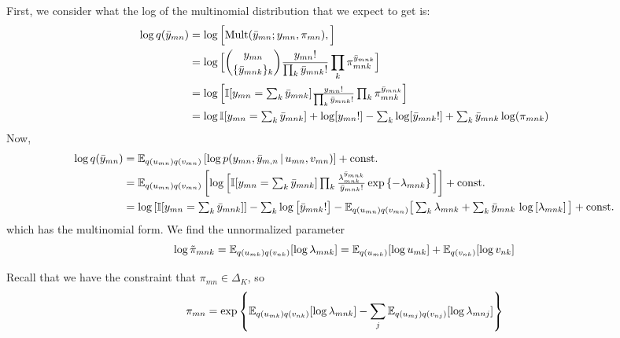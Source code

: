\begin{enumerate}[label=(\alph*)]
\begin{solution}
First, we consider what the log of the multinomial distribution that we expect to get is:
\begin{align*}
    \log q(\bar{y}_{mn})
        &= \log \Big[\mathrm{Mult}(\bar{y}_{mn} ; y_{mn}, \pi_{mn}),\Big]\\
        &= \log \Big[\binom{y_{mn}}{\{\bar{y}_{mnk}\}_k}
                    \frac{y_{mn}!}{\prod_k \bar{y}_{mnk}!}
                    \prod_k \pi_{mnk}^{\bar{y}_{mnk}}\Big] \\
        &= \log \Big[\mathbb{I}[y_{mn} = \textstyle\sum_k \bar{y}_{mnk}]
                    \frac{y_{mn}!}{\prod_k \bar{y}_{mnk}!}
                    \prod_k \pi_{mnk}^{\bar{y}_{mnk}}\Big] \\
        &= \log \mathbb{I}[y_{mn} = \textstyle\sum_k \bar{y}_{mnk}]
            + \log[y_{mn}!] - \sum_k \log[\bar{y}_{mnk}!]
            +\sum_k \bar{y}_{mnk}\log(\pi_{mnk})
\end{align*}
Now,
\begin{align*}
    \log q(\bar{y}_{mn})
        &= \mathbb{E}_{q(u_{mn}) q(v_{mn})} \left[
            \log p(y_{mn}, \bar{y}_{m,n} \,|\, u_{mn}, v_{mn}) \right]
            + \textrm{const.}\\
        &= \mathbb{E}_{q(u_{mn}) q(v_{mn})} \left[
            \log \Big[
                \mathbb{I}[y_{mn} = \textstyle\sum_k \bar{y}_{mnk}]
                \prod_k \frac{\lambda_{mnk}^{\bar{y}_{mnk}}}{\bar{y}_{mnk}!}
                    \exp\left\{ -\lambda_{mnk} \right\}
            \Big]\right]
            + \textrm{const.}\\
        &= \log \left[\mathbb{I}[y_{mn} = \textstyle\sum_k \bar{y}_{mnk}]\right]
            - \textstyle\sum_k \log\big[\bar{y}_{mnk}!\big]
            - \mathbb{E}_{q(u_{mn}) q(v_{mn})}\big[\textstyle\sum_k \lambda_{mnk}
                + \textstyle\sum_k
                    \bar{y}_{mnk}\,\log\left[\lambda_{mnk}\right]\big]
            + \textrm{const.}
\end{align*}
which has the multinomial form. We find the unnormalized parameter
$$
\log\tilde{\pi}_{mnk} = \mathbb{E}_{q(u_{mk}) q(v_{nk})}[\log\lambda_{mnk}]
= \mathbb{E}_{q(u_{mk})}[\log u_{mk}] + \mathbb{E}_{q(v_{nk})}[\log v_{nk}]
$$

Recall that we have the constraint that $\pi_{mn} \in \Delta_K$, so
$$
\pi_{mn} = \exp\left\{ \mathbb{E}_{q(u_{mk}) q(v_{nk})}[\log\lambda_{mnk}]
            -\sum_j\mathbb{E}_{q(u_{mj}) q(v_{nj})}[\log\lambda_{mnj}] \right\}
$$
\end{solution}


\end{enumerate}
